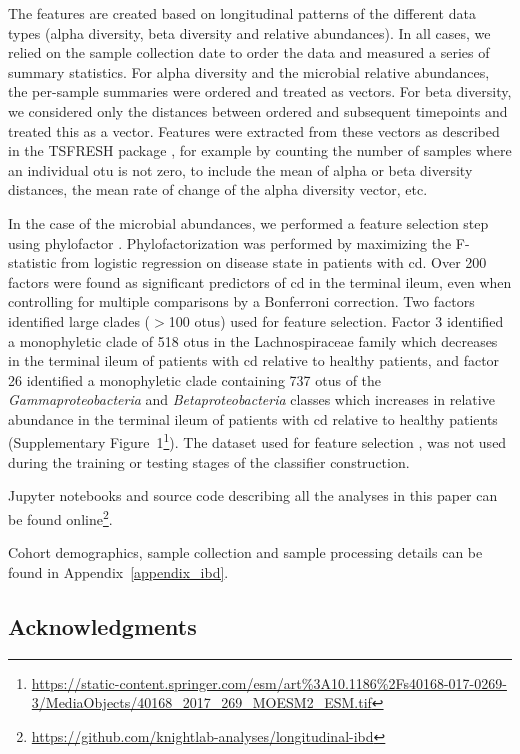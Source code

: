 The features are created based on longitudinal patterns of the different data 
types (alpha diversity, beta diversity and relative abundances). In all cases, 
we relied on the sample collection date to order the data and measured a series 
of summary statistics. For alpha diversity and the microbial relative 
abundances, the per-sample summaries were ordered and treated as vectors. For 
beta diversity, we considered only the distances between ordered and subsequent 
timepoints and treated this as a vector. Features were extracted from these 
vectors as described in the TSFRESH package \cite{RN4216}, for example by 
counting the number of samples where an individual \gls{otu} is not zero, to 
include the mean of alpha or beta diversity distances, the mean rate of change 
of the alpha diversity vector, etc.

In the case of the microbial abundances, we performed a feature selection step 
using phylofactor \cite{RN4204}. Phylofactorization was performed by maximizing 
the F-statistic from logistic regression on disease state in patients with 
\gls{cd}. Over 200 factors were found as significant predictors of \gls{cd} in 
the terminal ileum, even when controlling for multiple comparisons by a 
Bonferroni correction. Two factors identified large clades ($>$100 \glspl{otu}) 
used for feature selection. Factor 3 identified a monophyletic clade of 518 
\glspl{otu} in the Lachnospiraceae family which decreases in the terminal ileum 
of patients with \gls{cd} relative to healthy patients, and factor 26 
identified a monophyletic clade containing 737 \glspl{otu} of the 
\textit{Gammaproteobacteria} and \textit{Betaproteobacteria} classes which 
increases in relative abundance in the terminal ileum of patients with \gls{cd} 
relative to healthy patients (Supplementary 
Figure~1\footnote{\url{https://static-content.springer.com/esm/art\%3A10.1186\%2Fs40168-017-0269-3/MediaObjects/40168_2017_269_MOESM2_ESM.tif}}).  
The dataset used for feature selection \cite{RN154}, was not used during the 
training or testing stages of the classifier construction.

Jupyter notebooks and source code describing all the analyses in this paper can 
be found 
online\footnote{\url{https://github.com/knightlab-analyses/longitudinal-ibd}}.

Cohort demographics, sample collection and sample processing details can be 
found in Appendix~\ref{appendix_ibd}.

\subsection{Acknowledgments}

